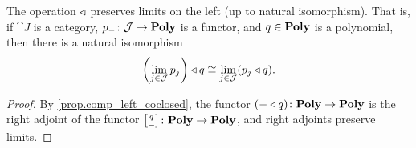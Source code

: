 \documentclass[Book-Poly]{subfiles}
\begin{document}

\begin{proposition} \label{prop.left_pres_lim}
The operation $\mathbin{\triangleleft}$ preserves limits on the left (up to natural isomorphism).
That is, if $\cat{J}$ is a category, $p_-\colon\mathcal{J}\to\mathbf{Poly}$ is a functor, and $q\in\mathbf{Poly}$ is a polynomial, then there is a natural isomorphism
\begin{equation} \label{eqn.comp_left_pres_lim}
    \left(\lim_{j\in\mathcal{J}}p_j\right)\mathbin{\triangleleft} q\cong\lim_{j\in\mathcal{J}}(p_j\mathbin{\triangleleft} q).
\end{equation}
\end{proposition}
\begin{proof}
By \cref{prop.comp_left_coclosed}, the functor $(-\mathbin{\triangleleft} q)\colon\mathbf{Poly}\to\mathbf{Poly}$ is the right adjoint of the functor $\lchom{q}{-}\colon\poly\to\poly$, and right adjoints preserve limits.
\end{proof}
\end{document}
